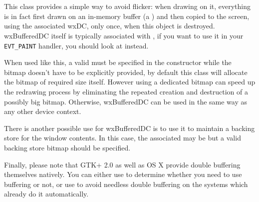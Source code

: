 
\section{}\label{wxbuffereddc}

This class provides a simple way to avoid flicker: when drawing on it,
everything is in fact first drawn on an in-memory buffer (a
) and then copied to the screen, using the
associated wxDC, only once, when this object is destroyed. wxBufferedDC itself
is typically associated with , if you want to
use it in your \texttt{EVT\_PAINT} handler, you should look at
 instead.

When used like this, a valid  must be specified in the constructor
while the  bitmap doesn't have to be explicitly provided, by
default this class will allocate the bitmap of required size itself. However
using a dedicated bitmap can speed up the redrawing process by eliminating the
repeated creation and destruction of a possibly big bitmap. Otherwise,
wxBufferedDC can be used in the same way as any other device context. 

There is another possible use for wxBufferedDC is to use it to maintain a
backing store for the window contents. In this case, the associated 
may be \NULL but a valid backing store bitmap should be specified.

Finally, please note that GTK+ 2.0 as well as OS X provide double buffering
themselves natively. You can either use  
to determine whether you need to use buffering or not, or use 
 to avoid needless double
buffering on the systems which already do it automatically.


\\
\\

